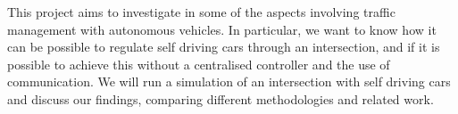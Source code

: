 This project aims to investigate in some of the aspects involving traffic management with autonomous vehicles.
In particular, we want to know how it can be possible to regulate self driving cars through an intersection, and if it is possible to achieve this without a centralised controller and the use of communication.
We will run a simulation of an intersection with self driving cars and discuss our findings, comparing different methodologies and related work.